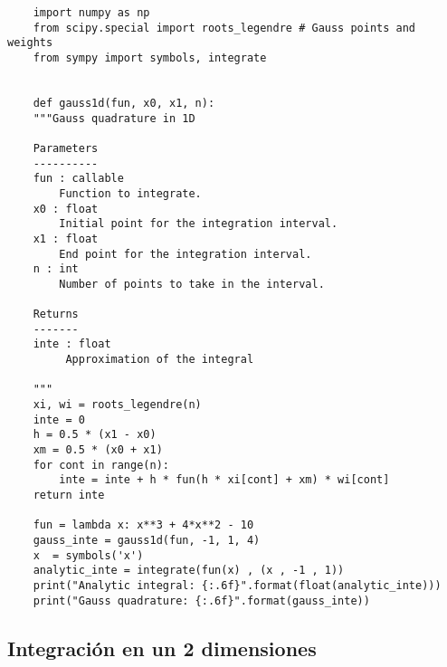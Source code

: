 \begin{verbatim} 
    import numpy as np
    from scipy.special import roots_legendre # Gauss points and weights
    from sympy import symbols, integrate
    
    
    def gauss1d(fun, x0, x1, n):
    """Gauss quadrature in 1D
    
    Parameters
    ----------
    fun : callable
        Function to integrate.
    x0 : float
        Initial point for the integration interval.
    x1 : float
        End point for the integration interval.
    n : int
        Number of points to take in the interval.
    
    Returns
    -------
    inte : float
         Approximation of the integral
    
    """
    xi, wi = roots_legendre(n)
    inte = 0
    h = 0.5 * (x1 - x0)
    xm = 0.5 * (x0 + x1)
    for cont in range(n):
        inte = inte + h * fun(h * xi[cont] + xm) * wi[cont]
    return inte

    fun = lambda x: x**3 + 4*x**2 - 10
    gauss_inte = gauss1d(fun, -1, 1, 4)
    x  = symbols('x')
    analytic_inte = integrate(fun(x) , (x , -1 , 1))
    print("Analytic integral: {:.6f}".format(float(analytic_inte)))
    print("Gauss quadrature: {:.6f}".format(gauss_inte))
\end{verbatim}


\subsection{Integración en un 2 dimensiones}

